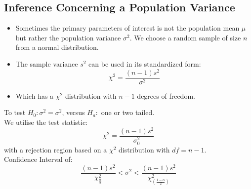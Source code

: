 \documentclass[12pt, letterpaper]{article}
\begin{document}
        \subsection{Inference Concerning a Population Variance}
            \begin{itemize}
                \item Sometimes the primary parameters of interest is not the population mean $\mu$ but rather the population variance $\sigma^2$. We choose a random sample of size $n$ from a normal distribution.
                \item The sample variance $s^2$ can be used in its standardized form: $$\chi^2 = \frac{(n-1)s^2}{\sigma^2}$$
                \item Which has a $\chi^2$ distribution with $n-1$ degrees of freedom.
            \end{itemize}
            \begin{mdframed}[leftmargin=0.5cm, rightmargin=0.5cm]
                To test $H_0: \sigma^2 = \sigma^2$, versus $H_a:$ one or two tailed. \\
                We utilise the test statistic:
                \begin{equation*}
                    \chi^2 = \frac{(n-1)s^2}{\sigma_0^2}
                \end{equation*}
                with a rejection region based on a $\chi^2$ distribution with $df = n - 1$. \\
                Confidence Interval of:
                \begin{equation*}
                    \frac{(n-1)s^2}{\chi^2_{\frac{\alpha}{2}}} < \sigma^2 < \frac{(n - 1)s^2}{\chi^2_{(\frac{1-\alpha}{2})}}
                \end{equation*}
            \end{mdframed}
\end{document}
